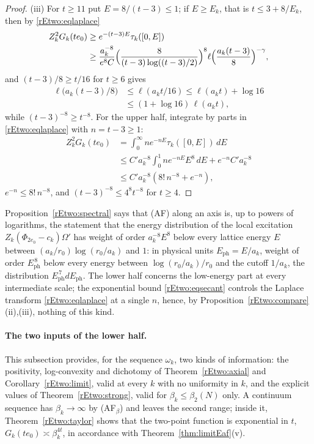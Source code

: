 \begin{proof}
(iii) For $t\ge11$ put $E=8/(t-3)\le1$; if $E\ge E_k$, that is $t\le3+8/
E_k$, then by \eqref{rEtwo:eqlaplace}
\begin{align*}
Z_k^2G_k(te_0)&\ge e^{-(t-3)E}\tau_k([0,E])\\
&\ge\frac{a_k^{-8}}{e^{8}C}\Bigl(\frac{8}{(t-3)\log((t-3)/2)}\Bigr)^8
\ell\Bigl(\frac{a_k(t-3)}8\Bigr)^{-\gamma},
\end{align*}
and $(t-3)/8\ge t/16$ for $t\ge6$ gives
\begin{align*}
\ell\bigl(a_k(t-3)/8\bigr)&\le\ell(a_kt/16)\le\ell(a_kt)+\log16\\
&\le(1+\log16)\,\ell(a_kt),
\end{align*}
while $(t-3)^{-8}\ge t^{-8}$.
For the upper half, integrate by parts in \eqref{rEtwo:eqlaplace} with
$n=t-3\ge1$:
\begin{align*}
Z_k^2G_k(te_0)&=\int_0^\infty ne^{-nE}\tau_k([0,E])\,dE\\
&\le C'a_k^{-8}\int_0^1ne^{-nE}E^8\,dE+e^{-n}C'a_k^{-8}\\
&\le C'a_k^{-8}(8!\,n^{-8}+e^{-n}),
\end{align*}
$e^{-n}\le8!\,n^{-8}$, and $(t-3)^{-8}\le4^8t^{-8}$ for $t\ge4$.
\end{proof}

\begin{remark}\label{rEtwo:spectralremark}
Proposition~\ref{rEtwo:spectral} says that (AF) along an axis is, up to
powers of logarithms, the statement that the energy distribution of the
local excitation $Z_k(\Phi_{2e_0}-c_k)\Omega'$ has weight of order
$a_k^{-8}E^8$ below every lattice energy $E$ between $(a_k/r_0)\log(r_0/a_k)$
and $1$: in physical units $E_{\mathrm{ph}}=E/a_k$, weight of order
$E_{\mathrm{ph}}^{\,8}$ below every energy between $\log(r_0/a_k)/r_0$ and
the cutoff $1/a_k$, the distribution $E_{\mathrm{ph}}^{\,7}dE_{\mathrm{ph}}$.
The lower half concerns the low-energy part at every intermediate scale;
the exponential bound \eqref{rEtwo:eqsecant} controls the Laplace transform
\eqref{rEtwo:eqlaplace} at a single $n$, hence, by
Proposition~\ref{rEtwo:compare}(ii),(iii), nothing of this kind.
\end{remark}

\paragraph{The two inputs of the lower half.} This subsection provides, for
the sequence $\omega_k$, two kinds of information: the positivity,
log-convexity and dichotomy of Theorem~\ref{rEtwo:axial} and
Corollary~\ref{rEtwo:limit}, valid at every $k$ with no uniformity in $k$,
and the explicit values of Theorem~\ref{rEtwo:strong}, valid for $\beta_k
\le\beta_2(N)$ only. A continuum sequence has $\beta_k\to\infty$ by
(AF$_\beta$) and leaves the second range; inside it,
Theorem~\ref{rEtwo:taylor} shows that the two-point function is
exponential in $t$, $G_k(te_0)\asymp\beta_k^{4t}$, in accordance with
Theorem~\ref{thm:limitEaf}(v).

